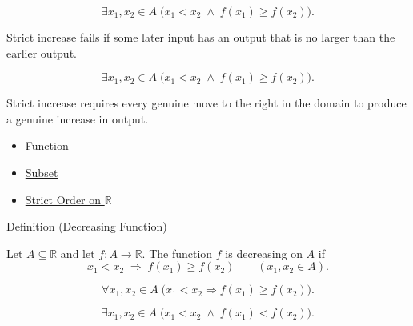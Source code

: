 \begin{remark*}
\[
  \exists x_1,x_2\in A\;\bigl(x_1<x_2\;\wedge\;f(x_1)\geq f(x_2)\bigr).
\]
\end{remark*}

\begin{remark*}
Strict increase fails if some later input has an output that is no larger
than the earlier output.
\end{remark*}

\begin{remark*}
\[
  \exists x_1,x_2\in A\;\bigl(x_1<x_2\;\wedge\;f(x_1)\geq f(x_2)\bigr).
\]
\end{remark*}

\begin{remark*}[Interpretation]
Strict increase requires every genuine move to the right in the domain to
produce a genuine increase in output.
\end{remark*}

\begin{dependencies}
\begin{itemize}
  \item \hyperref[def:function]{Function}
  \item \hyperref[def:subset]{Subset}
  \item \hyperref[def:strict-order-on-r]{Strict Order on $\mathbb{R}$}
\end{itemize}
\end{dependencies}

\begin{definitionbox}{Definition (Decreasing Function)}
\begin{definition}
\label{def:function-decreasing}
Let $A\subseteq\mathbb{R}$ and let $f:A\to\mathbb{R}$.  The function
$f$ is decreasing on $A$ if
\[
  x_1<x_2\;\Longrightarrow\;f(x_1)\geq f(x_2)
  \qquad (x_1,x_2\in A).
\]
\end{definition}
\end{definitionbox}

\begin{remark*}
\[
  \forall x_1,x_2\in A\;\bigl(x_1<x_2\Rightarrow f(x_1)\geq f(x_2)\bigr).
\]
\end{remark*}

\begin{remark*}
\[
  \exists x_1,x_2\in A\;\bigl(x_1<x_2\;\wedge\;f(x_1)<f(x_2)\bigr).
\]
\end{remark*}

